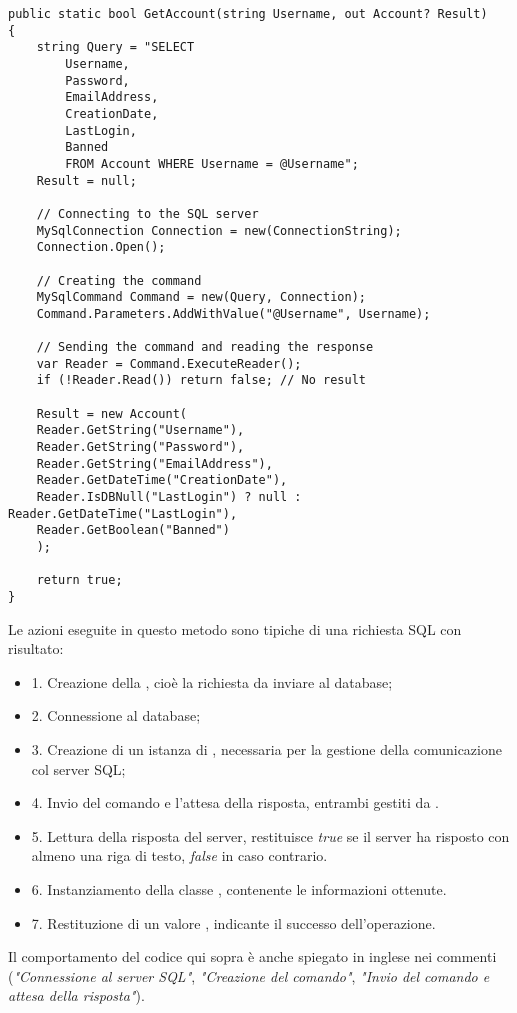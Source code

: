 \documentclass{article}
\begin{document}
\begin{verbatim}
public static bool GetAccount(string Username, out Account? Result)
{
	string Query = "SELECT 
		Username, 
		Password, 
		EmailAddress, 
		CreationDate, 
		LastLogin, 
		Banned 
		FROM Account WHERE Username = @Username";
	Result = null;
	
	// Connecting to the SQL server
	MySqlConnection Connection = new(ConnectionString);
	Connection.Open();
	
	// Creating the command
	MySqlCommand Command = new(Query, Connection);
	Command.Parameters.AddWithValue("@Username", Username);
	
	// Sending the command and reading the response
	var Reader = Command.ExecuteReader();
	if (!Reader.Read()) return false; // No result
	
	Result = new Account(
	Reader.GetString("Username"),
	Reader.GetString("Password"),
	Reader.GetString("EmailAddress"),
	Reader.GetDateTime("CreationDate"),
	Reader.IsDBNull("LastLogin") ? null : Reader.GetDateTime("LastLogin"),
	Reader.GetBoolean("Banned")
	);
	
	return true;
}
\end{verbatim}
Le azioni eseguite in questo metodo sono tipiche di una richiesta SQL con risultato:
\begin{itemize}
	\item 1. Creazione della , cioè la richiesta da inviare al database;
	\item 2. Connessione al database;
	\item 3. Creazione di un istanza di , necessaria per la gestione della comunicazione col server SQL;
	\item 4. Invio del comando e l'attesa della risposta, entrambi gestiti da .
	\item 5. Lettura della risposta del server,  restituisce \textit{true} se il server ha risposto con almeno una riga di testo, \textit{false} in caso contrario.
	\item 6. Instanziamento della classe , contenente le informazioni ottenute.
	\item 7. Restituzione di un valore , indicante il successo dell'operazione.
\end{itemize}
Il comportamento del codice qui sopra è anche spiegato in inglese nei commenti (\textit{"Connessione al server SQL"}, \textit{"Creazione del comando"}, \textit{"Invio del comando e attesa della risposta"}).
\end{document}
